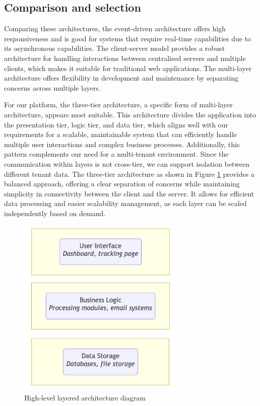\subsection{Comparison and selection}
Comparing these architectures, the event-driven architecture offers high responsiveness and is good for systems that require real-time capabilities due to its asynchronous capabilities.
The client-server model provides a robust architecture for handling interactions between centralised servers and multiple clients, which makes it suitable for traditional web applications. 
The multi-layer architecture offers flexibility in development and maintenance by separating concerns across multiple layers.

For our platform, the three-tier architecture, a specific form of multi-layer architecture, appears most suitable. This architecture divides the application into the presentation tier, logic tier, and data tier, which aligns well with our requirements for a scalable, maintainable system that can efficiently handle multiple user interactions and complex business processes. 
Additionally, this pattern complements our need for a multi-tenant environment.
Since the communication within layers is not cross-tier, we can support isolation between different tenant data.
The three-tier architecture as shown in Figure \ref{img03:layered_architecture_diagram} provides a balanced approach, offering a clear separation of concerns while maintaining simplicity in connectivity between the client and the server. 
It allows for efficient data processing and easier scalability management, as each layer can be scaled independently based on demand.

\begin{figure}[H]\centering
\includegraphics[width=80mm]{img/chap03/fig_layered_architecture_mermaid.png}
\caption{High-level layered architecture diagram}
\label{img03:layered_architecture_diagram}
\end{figure}


